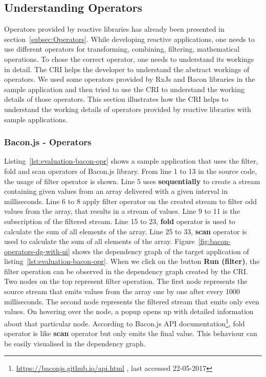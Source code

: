 \subsection{Understanding Operators}

Operators provided by reactive libraries has already been presented in section~\ref{subsec:Operators}. While developing reactive applications, one needs to use different operators for transforming, combining, filtering, mathematical operations. To chose the correct operator, one needs to understand its workings in detail. The CRI helps the developer to understand the abstract workings of operators. We used some operators provided by RxJs and Bacon libraries in the sample application and then tried to use the CRI to understand the working details of those operators. This section illustrates how the CRI helps to understand the working details of operators provided by reactive libraries with sample applications.

\subsubsection{Bacon.js - Operators}

Listing~\ref{lst:evaluation-bacon-opr} shows a sample application that uses the filter, fold and scan operators of Bacon.js library. From line 1 to 13 in the source code, the usage of filter operator is shown. Line 5 uses \textbf{sequentially} to create a stream containing given values from an array delivered with a given interval in milliseconds. Line 6 to 8 apply filter operator on the created stream to filter odd values from the array, that results in a stream of values. Line 9 to 11 is the subscription of the filtered stream.
Line 15 to 23,  \textbf{fold} operator is used to calculate the sum of all elements of the array. Line 25 to 33,  \textbf{scan} operator is used to calculate the sum of all elements of the array. Figure~\ref{fig:bacon-operators-dg-with-ui} shows the dependency graph of the target application of listing~\ref{lst:evaluation-bacon-opr}. When we click on the button \textbf{Run (filter)}, the filter operation can be observed in the dependency graph created by the CRI. Two nodes on the top represent filter operation. The first node represents the source stream that emits values from the array one by one after every 1000 milliseconds. The second node represents the filtered stream that emits only even values.
On hovering over the node, a popup opens up with detailed information about that particular node. 
According to Bacon.js API documentation\footnote{\url{https://baconjs.github.io/api.html} , last accessed 22-05-2017}, fold operator is like \textbf{scan} operator but only emits the final value. This behaviour can be easily visualised in the dependency graph.


